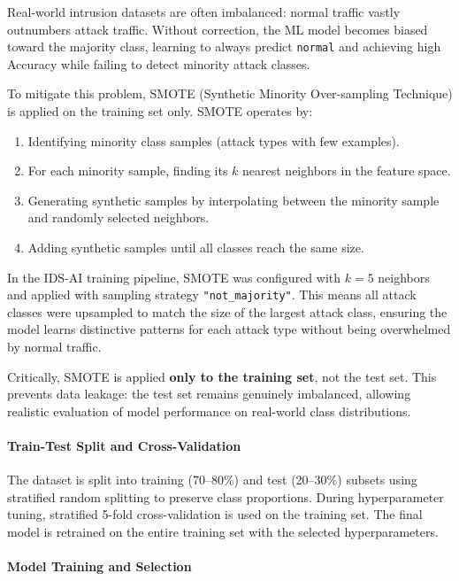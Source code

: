 \documentclass[12pt,a4paper]{report}
\begin{document}
Real-world intrusion datasets are often imbalanced: normal traffic vastly
outnumbers attack traffic. Without correction, the ML model becomes biased
toward the majority class, learning to always predict \texttt{normal} and
achieving high Accuracy while failing to detect minority attack classes.

To mitigate this problem, SMOTE (Synthetic Minority Over-sampling Technique)
is applied on the training set only. SMOTE operates by:

\begin{enumerate}[leftmargin=1.5em]
  \item Identifying minority class samples (attack types with few examples).
  \item For each minority sample, finding its $k$ nearest neighbors in the
    feature space.
  \item Generating synthetic samples by interpolating between the minority
    sample and randomly selected neighbors.
  \item Adding synthetic samples until all classes reach the same size.
\end{enumerate}

In the IDS-AI training pipeline, SMOTE was configured with $k=5$ neighbors
and applied with sampling strategy \texttt{"not\_majority"}. This means all
attack classes were upsampled to match the size of the largest attack class,
ensuring the model learns distinctive patterns for each attack type without
being overwhelmed by normal traffic.

Critically, SMOTE is applied \textbf{only to the training set}, not the test
set. This prevents data leakage: the test set remains genuinely imbalanced,
allowing realistic evaluation of model performance on real-world class
distributions.

\paragraph{Train-Test Split and Cross-Validation}

The dataset is split into training (70--80\%) and test (20--30\%) subsets
using stratified random splitting to preserve class proportions. During
hyperparameter tuning, stratified 5-fold cross-validation is used on the
training set. The final model is retrained on the entire training set with the
selected hyperparameters.

\paragraph{Model Training and Selection}
\end{document}

